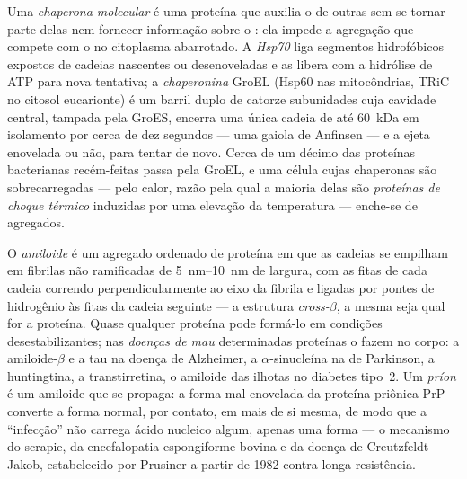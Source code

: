 \begin{definition}[Chaperonas]\label{def:b3:structural-biology:chaperones}
Uma \emph{chaperona molecular} é uma proteína que auxilia o
 de outras sem se tornar parte delas nem fornecer
informação sobre o : ela impede a agregação que compete com
o  no citoplasma abarrotado. A \emph{Hsp70} liga segmentos
hidrofóbicos expostos de cadeias nascentes ou desenoveladas e as libera
com a hidrólise de ATP para nova tentativa; a \emph{chaperonina} GroEL
(Hsp60 nas mitocôndrias, TRiC no citosol eucarionte) é um barril duplo
de catorze subunidades cuja cavidade central, tampada pela GroES,
encerra uma única cadeia de até \qty{60}{kDa} em isolamento por cerca
de dez segundos --- uma gaiola de Anfinsen --- e a ejeta enovelada ou
não, para tentar de novo. Cerca de um décimo das proteínas bacterianas
recém-feitas passa pela GroEL, e uma célula cujas chaperonas são
sobrecarregadas --- pelo calor, razão pela qual a maioria delas são
\emph{proteínas de choque térmico} induzidas por uma elevação da
temperatura --- enche-se de agregados.
\end{definition}

\begin{definition}[Amiloide]\label{def:b3:structural-biology:amyloid}
O \emph{amiloide} é um agregado ordenado de proteína em que as cadeias
se empilham em fibrilas não ramificadas de \qtyrange{5}{10}{nm} de
largura, com as fitas de cada cadeia correndo perpendicularmente ao
eixo da fibrila e ligadas por pontes de hidrogênio às fitas da cadeia
seguinte --- a estrutura \emph{cross-$\beta$}, a mesma seja qual for a
proteína. Quase qualquer proteína pode formá-lo em condições
desestabilizantes; nas \emph{doenças de mau } determinadas
proteínas o fazem no corpo: a amiloide-$\beta$ e a tau na doença de
Alzheimer, a $\alpha$-sinucleína na de Parkinson, a huntingtina, a
transtirretina, o amiloide das ilhotas no diabetes tipo~2. Um
\emph{príon} é um amiloide que se propaga: a forma mal enovelada da
proteína priônica PrP converte a forma normal, por contato, em mais de
si mesma, de modo que a ``infecção'' não carrega ácido nucleico algum,
apenas uma forma --- o mecanismo do scrapie, da encefalopatia
espongiforme bovina e da doença de Creutzfeldt--Jakob, estabelecido por
Prusiner a partir de 1982 contra longa resistência.
\end{definition}

